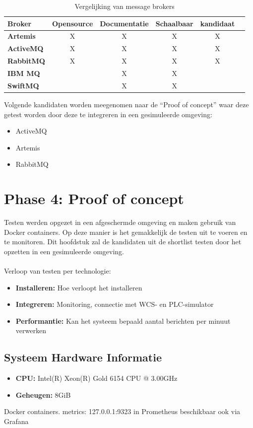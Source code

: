 \begin{table}[h!]
  \centering
  \footnotesize
\begin{tabular}{|l|c|c|c|c|c|}
  \hline
  \textbf{Broker} & \textbf{Opensource} & \textbf{Documentatie} & \textbf{Schaalbaar} & \textbf{kandidaat}\\ \hline
  \textbf{Artemis}   & X & X & X & X \\ \hline
  \textbf{ActiveMQ}  & X & X & X & X \\ \hline
  \textbf{RabbitMQ}  & X & X & X & X \\ \hline  
  \textbf{IBM MQ}    &   & X & X &  \\ \hline 
  \textbf{SwiftMQ}   &   & X & X &  \\ \hline 
\end{tabular}
\caption{Vergelijking van message brokers}
\label{tab:vergelijking_message_brokers_should_have}
\end{table}

Volgende kandidaten worden meegenomen naar de ``Proof of concept'' waar deze getest worden door deze te integreren in een gesimuleerde omgeving:
\begin{itemize}
  \item ActiveMQ
  \item Artemis
  \item RabbitMQ
\end{itemize}
    
\section{Phase 4: Proof of concept}
Testen werden opgezet in een afgeschermde omgeving en maken gebruik van Docker containers.
Op deze manier is het gemakkelijk de testen uit te voeren en te monitoren.
Dit hoofdstuk zal de kandidaten uit de shortlist testen door het opzetten in een gesimuleerde omgeving.
\\\\
Verloop van testen per technologie:
\begin{itemize}
  \item \textbf{Installeren:} Hoe verloopt het installeren
  \item \textbf{Integreren:} Monitoring, connectie met WCS- en PLC-simulator
  \item \textbf{Performantie:} Kan het systeem bepaald aantal berichten per minuut verwerken
\end{itemize}

\subsection{Systeem Hardware Informatie}
\begin{itemize}
    \item \textbf{CPU:} Intel(R) Xeon(R) Gold 6154 CPU @ 3.00GHz
    \item \textbf{Geheugen:} 8GiB
\end{itemize}
Docker containers.
metrics: 127.0.0.1:9323 in Prometheus beschikbaar
ook via Grafana

